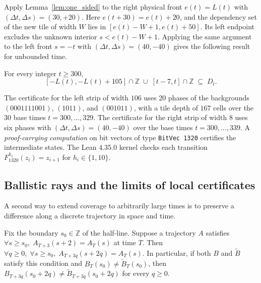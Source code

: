 Apply Lemma~\ref{lem:one_sided} to the right physical front $e(t) = L(t)$ with $(\Delta t, \Delta s) = (30, +20)$. Here $e(t+30) = e(t) + 20$, and the dependency set of the new tile of width $W$ lies in $[e(t) - W + 1, e(t) + 50]$. Its left endpoint excludes the unknown interior $s < e(t) - W + 1$. Applying the same argument to the left front $s = -t$ with $(\Delta t, \Delta s) = (40,-40)$ gives the following result for unbounded time.

\begin{theorem}\label{thm:dual_strips}
For every integer $t \ge 300$,
\begin{equation}\label{eq:dual_strips}
[-L(t), -L(t) + 105] \cap \mathbb{Z} \;\cup\; [t - 7, t] \cap \mathbb{Z} \;\subseteq\; D_t.
\end{equation}
\end{theorem}

The certificate for the left strip of width $106$ uses $20$ phases of the backgrounds $(0001111001)$, $(1011)$, and $(001011)$, with a tile depth of $167$ cells over the $30$ base times $t = 300, \dots, 329$. The certificate for the right strip of width $8$ uses six phases with $(\Delta t, \Delta s) = (40,-40)$ over the base times $t = 300, \dots, 339$. A \emph{proof-carrying computation} on bit vectors of type \texttt{BitVec 1320} certifies the intermediate states. The Lean 4.35.0 kernel checks each transition $F_{1320}^{h_i}(z_i) = z_{i+1}$ for $h_i \in \{1, 10\}$.

\subsection{Ballistic rays and the limits of local certificates}

A second way to extend coverage to arbitrarily large times is to preserve a difference along a discrete trajectory in space and time.

\begin{lemma}\label{lem:ballistic_ray}
Fix the boundary $s_0\in\mathbb Z$ of the half-line. Suppose a trajectory $A$ satisfies $\forall s \ge s_0,\; A_{T+3}(s + 2) = A_T(s)$ at time $T$. Then $\forall q \ge 0,\; \forall s \ge s_0,\; A_{T+3q}(s + 2q) = A_T(s)$. In particular, if both $B$ and $\widetilde B$ satisfy this condition and $B_T(s_0) \ne \widetilde B_T(s_0)$, then $B_{T+3q}(s_0 + 2q) \ne \widetilde B_{T+3q}(s_0 + 2q)$ for every $q \ge 0$.
\end{lemma}


